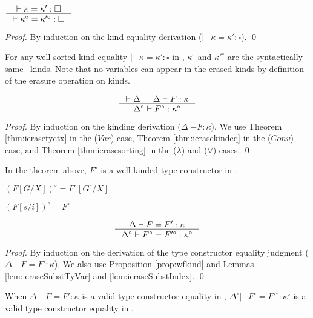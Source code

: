 \begin{theorem}\label{thm:ierasekindeq}
$ \inference{|- \kappa=\kappa':\square}
        {|- \kappa^\circ=\kappa'^\circ:\square}
$
\end{theorem}
\begin{proof}
        By induction on the kind equality derivation
        ($|- \kappa=\kappa':\square$).
        \qed
\end{proof}
\begin{remark}
For any well-sorted kind equality $|- \kappa=\kappa':\square$ in \Fi,
$\kappa^\circ$ and $\kappa'^\circ$ are the syntactically same \Fw\ kinds.
Note that no variables can appear in the erased kinds by definition of
the erasure operation on kinds.
\end{remark}

\begin{theorem}
\label{thm:ierasekinding}
\[ \inference{|- \Delta & \Delta |- F : \kappa}
                {\Delta^\circ |- F^\circ : \kappa^\circ}
\]
\end{theorem}
\begin{proof}
        By induction on the kinding derivation ($\Delta |- F : \kappa$).
        We use Theorem \ref{thm:ierasetyctx} in the ($Var$) case,
        Theorem \ref{thm:ierasekindeq} in the ($Conv$) case, and
        Theorem \ref{thm:ierasesorting} in the ($\lambda$) and ($\forall$) cases.
        \qed
\end{proof}
\begin{remark} In the theorem above, $F^\circ$ is a well-kinded type constructor in \Fw.
\end{remark}

\noindent
\begin{minipage}{.55\linewidth}
\begin{lemma}\label{lem:ieraseSubstTyVar}
$(F[G/X])^\circ = F^\circ[G^\circ/X]$
\end{lemma}
\end{minipage}
\begin{minipage}{.4\linewidth}
\begin{lemma}\label{lem:ieraseSubstIndex}
$(F[s/i])^\circ = F^\circ$
\end{lemma}
\end{minipage}
\begin{theorem}
\label{thm:ierasetyconeq}
\[ \inference{\Delta |- F=F':\kappa}
                {\Delta^\circ |- F^\circ=F'^\circ:\kappa^\circ}
\]
\end{theorem}
\begin{proof}
        By induction on the derivation of the type constructor equality judgment
        ($\Delta |- F=F':\kappa$). We also use Proposition \ref{prop:wfkind}
        and Lemmas \ref{lem:ieraseSubstTyVar} and \ref{lem:ieraseSubstIndex}.
        \qed
\end{proof}
\begin{remark}
When $\Delta |- F=F':\kappa$ is a valid type constructor equality in \Fi,
$\Delta^\circ |- F^\circ=F'^\circ:\kappa^\circ$
is a valid type constructor equality in \Fw.
\end{remark}

